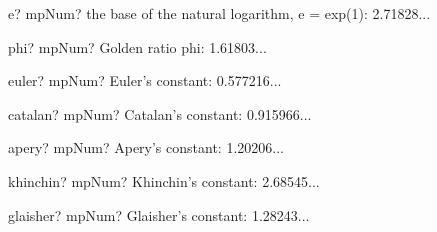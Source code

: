 \vspace{0.6cm}

\begin{mpFunctionsExtract}
	\mpFunctionZero
	{e? mpNum?  the base of the natural logarithm, e = exp(1): 2.71828...}
\end{mpFunctionsExtract}



\vspace{0.6cm}

\begin{mpFunctionsExtract}
	\mpFunctionZero
	{phi? mpNum?  Golden ratio phi: 1.61803...}
\end{mpFunctionsExtract}


\vspace{0.6cm}

\begin{mpFunctionsExtract}
	\mpFunctionZero
	{euler? mpNum?  Euler's constant: 0.577216...}
\end{mpFunctionsExtract}



\vspace{0.6cm}

\begin{mpFunctionsExtract}
	\mpFunctionZero
	{catalan? mpNum?  Catalan's constant: 0.915966...}
\end{mpFunctionsExtract}



\vspace{0.6cm}

\begin{mpFunctionsExtract}
	\mpFunctionZero
	{apery? mpNum?  Apery's constant: 1.20206...}
\end{mpFunctionsExtract}



\vspace{0.6cm}

\begin{mpFunctionsExtract}
	\mpFunctionZero
	{khinchin? mpNum?  Khinchin's constant: 2.68545...}
\end{mpFunctionsExtract}



\vspace{0.6cm}

\begin{mpFunctionsExtract}
	\mpFunctionZero
	{glaisher? mpNum?  Glaisher's constant: 1.28243...}
\end{mpFunctionsExtract}



